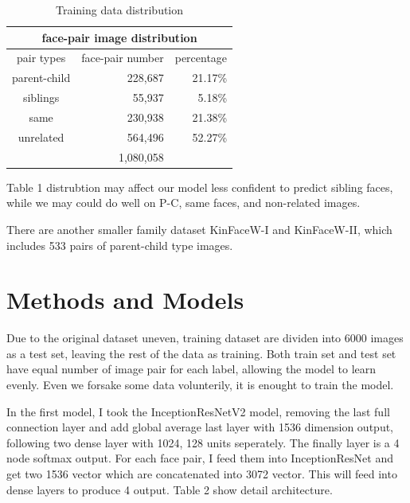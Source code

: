 \documentclass{article}
\begin{document}
\begin{table}[h]
	\centering
	\begin{tabular}{ | c || r r | }
		\hline
		\multicolumn{3}{|c|}{face-pair image distribution} \\
		\hline
		pair types&face-pair number&percentage\\
		\hline
			parent-child & 228,687 &21.17\% \\
			siblings & 55,937 & 5.18\% \\
			same & 230,938 & 21.38\% \\
			unrelated & 564,496 & 52.27\% \\
		\hline
			& 1,080,058 & \\
		\hline
	\end{tabular}
	\caption{Training data distribution}
	\label{table:1}
\end{table}

Table 1 distrubtion may affect our model less confident to predict sibling
faces, while we may could do well on P-C, same faces, and non-related images.

There are another smaller family dataset KinFaceW-I and KinFaceW-II, which
includes 533 pairs of parent-child type images.


\section{Methods and Models}

Due to the original dataset uneven, training dataset are dividen into 6000
images as a test set, leaving the rest of the data as training. Both train set
and test set have equal number of image pair for each label, allowing the model
to learn evenly. Even we forsake some data volunterily, it is enought to train
the model.

In the first model, I took the InceptionResNetV2 model, removing the last full
connection layer and add global average last layer with 1536 dimension output,
following two dense layer with 1024, 128 units seperately. The finally layer is
a 4 node softmax output. For each face pair, I feed them into InceptionResNet
and get two 1536 vector which are concatenated into 3072 vector. This will feed
into dense layers to produce 4 output. Table 2 show detail architecture.
\end{document}
